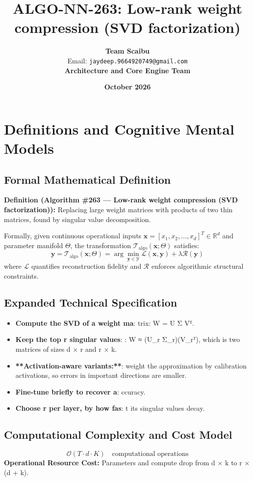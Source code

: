 \documentclass[11pt,a4paper]{article}
\title{\textbf{ALGO-NN-263: Low-rank weight compression (SVD factorization)}}
\author{\textbf{Team Scaibu} \\ \small Email: \texttt{jaydeep.9664920749@gmail.com} \\ \small \textbf{Architecture and Core Engine Team}}
\date{\textbf{October 2026}}
\theoremstyle{definition}
\begin{document}
\maketitle

\section{Definitions and Cognitive Mental Models}

\subsection{Formal Mathematical Definition}
\textbf{Definition (Algorithm \#263 --- Low-rank weight compression (SVD factorization)):}
Replacing large weight matrices with products of two thin matrices, found by singular value decomposition.

Formally, given continuous operational inputs $\mathbf{x} = [x_1, x_2, \dots, x_d]^T \in \mathbb{R}^d$ and parameter manifold $\Theta$, the transformation $\mathcal{T}_{\text{algo}}(\mathbf{x}; \Theta)$ satisfies:
{\boldmath
\begin{equation}
\mathbf{y} = \mathcal{T}_{\text{algo}}(\mathbf{x}; \Theta) = \arg\min_{\mathbf{y} \in \mathcal{Y}} \mathcal{L}(\mathbf{x}, \mathbf{y}) + \lambda \mathcal{R}(\mathbf{y})
\end{equation}
}
where $\mathcal{L}$ quantifies reconstruction fidelity and $\mathcal{R}$ enforces algorithmic structural constraints.

\subsection{Expanded Technical Specification}
\begin{itemize}
\item \textbf{Compute the SVD of a weight ma}: trix: W = U Σ Vᵀ.
\item \textbf{Keep the top r singular values}: : W ≈ (U\_r Σ\_r)(V\_rᵀ), which is two matrices of sizes d × r and r × k.
\item \textbf{**Activation-aware variants:**}:  weight the approximation by calibration activations, so errors in important directions are smaller.
\item \textbf{Fine-tune briefly to recover a}: ccuracy.
\item \textbf{Choose r per layer, by how fas}: t its singular values decay.
\end{itemize}

\subsection{Computational Complexity and Cost Model}
\begin{equation}
\mathcal{O}(T \cdot d \cdot K) \quad \text{computational operations}
\end{equation}
\textbf{Operational Resource Cost:} Parameters and compute drop from d × k to r × (d + k).
\end{document}
